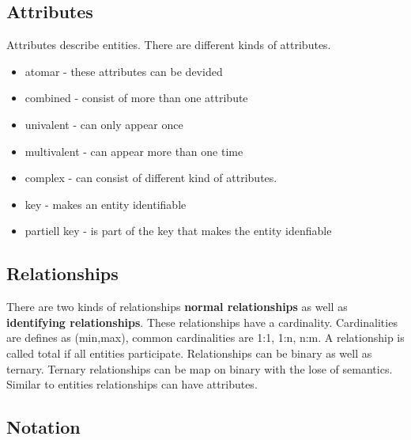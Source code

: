 \subsection{Attributes}
Attributes describe entities. There are different kinds of attributes.
\begin{itemize}
\setlength{\itemsep}{1pt}
	\item atomar - these attributes can be devided
	\item combined - consist of more than one attribute
	\item univalent - can only appear once
	\item multivalent - can appear more than one time
	\item complex - can consist of different kind of attributes.
	\item key - makes an entity identifiable
	\item partiell key - is part of the key that makes the entity idenfiable
\end{itemize}

\subsection{Relationships}
There are two kinds of relationships \textbf{normal relationships} as well as
\textbf{identifying relationships}. These relationships have a cardinality.
Cardinalities are defines as (min,max), common cardinalities are 1:1, 1:n, n:m.
A relationship is called total if all entities participate. Relationships can be
binary as well as ternary. Ternary relationships can be map on binary with the
lose of semantics. Similar to entities relationships can have attributes.

\subsection{Notation}
